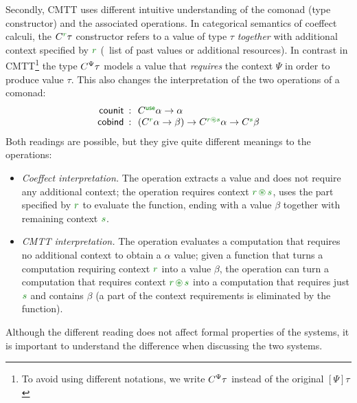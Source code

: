 Secondly, CMTT uses different intuitive understanding of the comonad (type constructor) and
the associated operations. In categorical semantics of coeffect calculi, the $\ctyp{\cclrd{r}}{\tau}$
constructor refers to a value of type $\tau$ \emph{together} with additional context specified
by $\cclrd{r}$ (\eg~list of past values or additional resources). In contrast in 
CMTT\footnote{To avoid using different notations, we write $C^{\Psi}\tau$ instead of the 
original $[\Psi]{\tau}$} the type $C^{\Psi}\tau$ models a value that \emph{requires} the 
context $\Psi$ in order to produce value $\tau$. This also changes the interpretation of the 
two operations of a comonad:
\begin{equation*}
\begin{array}{rcl}
 \ident{counit} &\narrow{:}& \ctyp{\cunit}{\alpha} \rightarrow \alpha\\
 \ident{cobind} &\narrow{:}& (\ctyp{\cclrd{r}}{\alpha} \rightarrow \beta) \rightarrow 
    \ctyp{\cclrd{r}\cseq\cclrd{s}}{\alpha} \rightarrow \ctyp{\cclrd{s}}{\beta}
\end{array}
\end{equation*}
Both readings are possible, but they give quite different meanings to the operations:

\begin{itemize}
\item \emph{Coeffect interpretation.} The  operation extracts a value 
  and does not require any additional context; the  operation requires
  context $\cclrd{r}\,\cseq\,\cclrd{s}$, uses the part specified by $\cclrd{r}$ to 
  evaluate the function, ending with a value $\beta$ together with remaining context
  $\cclrd{s}$.
\item \emph{CMTT interpretation.} The  operation evaluates a computation 
  that requires no additional context to obtain a $\alpha$ value; given a function that
  turns a computation requiring context $\cclrd{r}$ into a value $\beta$, the 
  operation can turn a computation that requires context $\cclrd{r}\,\cseq\,\cclrd{s}$ 
  into a computation that requires just $\cclrd{s}$ and contains $\beta$ (a part of the
  context requirements is eliminated by the function).
\end{itemize}

\noindent
Although the different reading does not affect formal properties of the systems, it is important
to understand the difference when discussing the two systems. 

